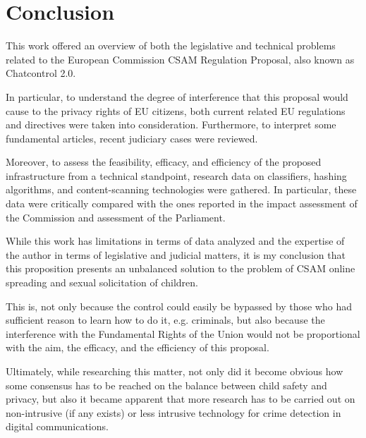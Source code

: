\section{Conclusion}
\label{s:concl}

This work offered an overview of both the legislative and technical problems related to the European Commission CSAM Regulation Proposal, also known as Chatcontrol 2.0.

In particular, to understand the degree of interference that this proposal would cause to the privacy rights of EU citizens, both current related EU regulations and directives were taken into consideration. Furthermore, to interpret some fundamental articles, recent judiciary cases were reviewed.

Moreover, to assess the feasibility, efficacy, and efficiency of the proposed infrastructure from a technical standpoint, research data on classifiers, hashing algorithms, and content-scanning technologies were gathered. In particular, these data were critically compared with the ones reported in the impact assessment of the Commission and assessment of the Parliament.

While this work has limitations in terms of data analyzed and the expertise of the author in terms of legislative and judicial matters, it is my conclusion that this proposition presents an unbalanced solution to the problem of CSAM online spreading and sexual solicitation of children.

This is, not only because the control could easily be bypassed by those who had sufficient reason to learn how to do it, e.g. criminals, but also because the interference with the Fundamental Rights of the Union would not be proportional with the aim, the efficacy, and the efficiency of this proposal.

Ultimately, while researching this matter, not only did it become obvious how some consensus has to be reached on the balance between child safety and privacy, but also it became apparent that more research has to be carried out on non-intrusive (if any exists) or less intrusive technology for crime detection in digital communications.